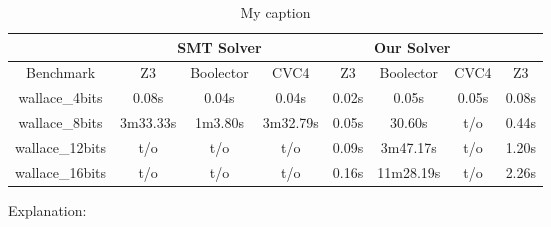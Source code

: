 \begin{table}[]
\centering
\caption{My caption}
\label{my-label}
\begin{tabular}{|c|c|c|c|c|c|c|c|}
\hline
                & \multicolumn{3}{c|}{SMT Solver} & \multicolumn{3}{c|}{Our Solver} &       \\ \hline
Benchmark       & Z3       & Boolector & CVC4     & Z3      & Boolector   & CVC4    & Z3    \\ \hline
wallace\_4bits  & 0.08s    & 0.04s     & 0.04s    & 0.02s   & 0.05s       & 0.05s   & 0.08s \\ \hline
wallace\_8bits  & 3m33.33s & 1m3.80s   & 3m32.79s & 0.05s   & 30.60s      & t/o     & 0.44s \\ \hline
wallace\_12bits & t/o      & t/o       & t/o      & 0.09s   & 3m47.17s    & t/o     & 1.20s \\ \hline
wallace\_16bits & t/o      & t/o       & t/o      & 0.16s   & 11m28.19s   & t/o     & 2.26s \\ \hline
\end{tabular}
\end{table}


Explanation:







 

